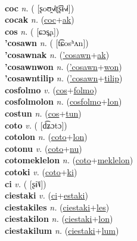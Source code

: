  \label{cohpoltilum} \\
\textbf{coc} \textit{n.} ( [ʂoʊ̯˧˩˧ʈ͡ʂɨ˧˩˧])
 \label{coc} \\
\textbf{cocak} \textit{n.} (\hyperref[coc]{coc}+\hyperref[ak]{ak})
 \label{cocak} \\
\textbf{cos} \textit{n.} ( [ɕɔs̪a])
 \label{cos} \\
\textbf{'cosawn} \textit{n.} ( [t͡ɕosʰʌn])
 \label{'cosawn} \\
\textbf{'cosawnak} \textit{n.} (\hyperref['cosawn]{'cosawn}+\hyperref[ak]{ak})
 \label{'cosawnak} \\
\textbf{'cosawnwon} \textit{n.} (\hyperref['cosawn]{'cosawn}+\hyperref[won]{won})
 \label{'cosawnwon} \\
\textbf{'cosawntilip} \textit{n.} (\hyperref['cosawn]{'cosawn}+\hyperref[tilip]{tilip})
 \label{'cosawntilip} \\
\textbf{cosfolmo} \textit{v.} (\hyperref[cos]{cos}+\hyperref[folmo]{folmo})
 \label{cosfolmo} \\
\textbf{cosfolmolon} \textit{n.} (\hyperref[cosfolmo]{cosfolmo}+\hyperref[lon]{lon})
 \label{cosfolmolon} \\
\textbf{costun} \textit{n.} (\hyperref[cos]{cos}+\hyperref[tun]{tun})
 \label{costun} \\
\textbf{coto} \textit{v.} ( [d͡ʑɔtɔ])
 \label{coto} \\
\textbf{cotolon} \textit{n.} (\hyperref[coto]{coto}+\hyperref[lon]{lon})
 \label{cotolon} \\
\textbf{cotonu} \textit{v.} (\hyperref[coto]{coto}+\hyperref[nu]{nu})
 \label{cotonu} \\
\textbf{cotomeklelon} \textit{n.} (\hyperref[coto]{coto}+\hyperref[meklelon]{meklelon})
 \label{cotomeklelon} \\
\textbf{cotoki} \textit{v.} (\hyperref[coto]{coto}+\hyperref[ki]{ki})
 \label{cotoki} \\
\textbf{ci} \textit{v.} ( [ʂɨ˥˩])
 \label{ci} \\
\textbf{ciestaki} \textit{v.} (\hyperref[ci]{ci}+\hyperref[estaki]{estaki})
 \label{ciestaki} \\
\textbf{ciestakiles} \textit{n.} (\hyperref[ciestaki]{ciestaki}+\hyperref[les]{les})
 \label{ciestakiles} \\
\textbf{ciestakilon} \textit{n.} (\hyperref[ciestaki]{ciestaki}+\hyperref[lon]{lon})
 \label{ciestakilon} \\
\textbf{ciestakilum} \textit{n.} (\hyperref[ciestaki]{ciestaki}+\hyperref[lum]{lum})
